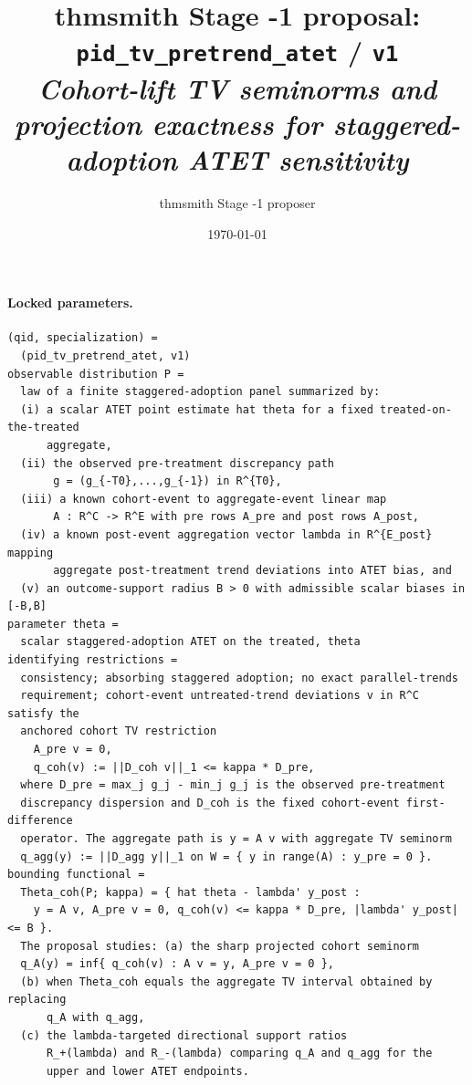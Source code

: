 \documentclass[11pt]{article}
\title{thmsmith Stage -1 proposal: \texttt{pid\_tv\_pretrend\_atet} / \texttt{v1}%
  \\ \large\textit{Cohort-lift TV seminorms and projection exactness for staggered-adoption ATET sensitivity}}
\author{thmsmith Stage -1 proposer}
\date{\today}
\theoremstyle{definition}
\theoremstyle{plain}
\theoremstyle{remark}
\begin{document}
\maketitle


\paragraph{Locked parameters.}
\begin{verbatim}
(qid, specialization) =
  (pid_tv_pretrend_atet, v1)
observable distribution P =
  law of a finite staggered-adoption panel summarized by:
  (i) a scalar ATET point estimate hat theta for a fixed treated-on-the-treated
      aggregate,
  (ii) the observed pre-treatment discrepancy path
       g = (g_{-T0},...,g_{-1}) in R^{T0},
  (iii) a known cohort-event to aggregate-event linear map
       A : R^C -> R^E with pre rows A_pre and post rows A_post,
  (iv) a known post-event aggregation vector lambda in R^{E_post} mapping
       aggregate post-treatment trend deviations into ATET bias, and
  (v) an outcome-support radius B > 0 with admissible scalar biases in [-B,B]
parameter theta =
  scalar staggered-adoption ATET on the treated, theta
identifying restrictions =
  consistency; absorbing staggered adoption; no exact parallel-trends
  requirement; cohort-event untreated-trend deviations v in R^C satisfy the
  anchored cohort TV restriction
    A_pre v = 0,
    q_coh(v) := ||D_coh v||_1 <= kappa * D_pre,
  where D_pre = max_j g_j - min_j g_j is the observed pre-treatment
  discrepancy dispersion and D_coh is the fixed cohort-event first-difference
  operator. The aggregate path is y = A v with aggregate TV seminorm
  q_agg(y) := ||D_agg y||_1 on W = { y in range(A) : y_pre = 0 }.
bounding functional =
  Theta_coh(P; kappa) = { hat theta - lambda' y_post :
    y = A v, A_pre v = 0, q_coh(v) <= kappa * D_pre, |lambda' y_post| <= B }.
  The proposal studies: (a) the sharp projected cohort seminorm
  q_A(y) = inf{ q_coh(v) : A v = y, A_pre v = 0 },
  (b) when Theta_coh equals the aggregate TV interval obtained by replacing
      q_A with q_agg,
  (c) the lambda-targeted directional support ratios
      R_+(lambda) and R_-(lambda) comparing q_A and q_agg for the
      upper and lower ATET endpoints.
\end{verbatim}
\end{document}
